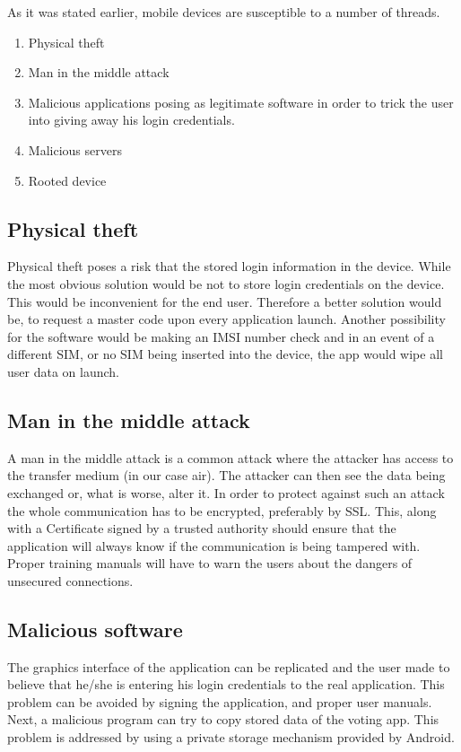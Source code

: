 \documentclass[11pt,twoside,a4paper]{book}
\begin{document}
As it was stated earlier, mobile devices are susceptible to a number of threads. 
\begin{enumerate}
\item Physical theft
\item Man in the middle attack
\item Malicious applications posing as legitimate software in order to trick the user into giving away his login credentials.
\item Malicious servers %
\item Rooted device
\end{enumerate}
\subsection{Physical theft}
Physical theft poses a risk that the stored login information in the device. While the most obvious solution would be not to store login credentials on the device. This would be inconvenient for the end user. Therefore a better solution would be, to request a master code upon every application launch. Another possibility for the software would be making an IMSI number check and in an event of a different SIM, or no SIM being inserted into the device, the app would wipe all user data on launch. 
\subsection{Man in the middle attack}
A man in the middle attack is a common attack where the attacker has access to the transfer medium (in our case air). The attacker can then see the data being exchanged or, what is worse, alter it. In order to protect against such an attack the whole communication has to be encrypted, preferably by SSL. This, along with a Certificate signed by a trusted authority should ensure that the application will always know if the communication is being tampered with. Proper training manuals will have to warn the users about the dangers of unsecured connections.
\subsection{Malicious software}
The graphics interface of the application can be replicated and the user made to believe that he/she is entering his login credentials to the real application. This problem can be avoided by signing the application, and proper user manuals.\\
Next, a malicious program can try to copy stored data of the voting app. This problem is addressed by using a private storage mechanism provided by Android. \cite{storageAnd}
\end{document}
